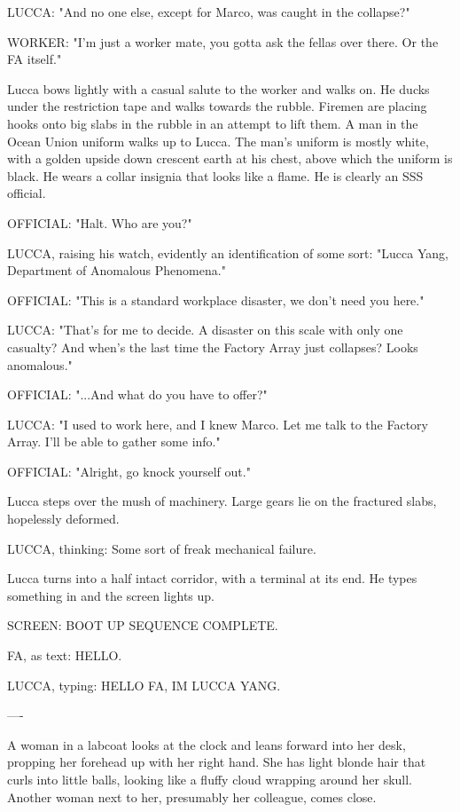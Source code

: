 \documentclass[11pt]{article}
\begin{document}
LUCCA: "And no one else, except for Marco, was caught in the collapse?"

WORKER: "I'm just a worker mate, you gotta ask the fellas over there. Or the FA itself."

Lucca bows lightly with a casual salute to the worker and walks on. 
He ducks under the restriction tape and walks towards the rubble. 
Firemen are placing hooks onto big slabs in the rubble in an attempt to lift them. 
A man in the Ocean Union uniform walks up to Lucca. 
The man's uniform is mostly white, with a golden upside down crescent earth at his chest, above which the uniform is black. 
He wears a collar insignia that looks like a flame. 
He is clearly an SSS official. 

OFFICIAL: "Halt. Who are you?"

LUCCA, raising his watch, evidently an identification of some sort: "Lucca Yang, Department of Anomalous Phenomena."

OFFICIAL: "This is a standard workplace disaster, we don't need you here."

LUCCA: "That's for me to decide. A disaster on this scale with only one casualty? 
And when's the last time the Factory Array just collapses? Looks anomalous."

OFFICIAL: "...And what do you have to offer?"

LUCCA: "I used to work here, and I knew Marco. Let me talk to the Factory Array. I'll be able to gather some info."

OFFICIAL: "Alright, go knock yourself out." 

Lucca steps over the mush of machinery. 
Large gears lie on the fractured slabs, hopelessly deformed. 

LUCCA, thinking: Some sort of freak mechanical failure. 

Lucca turns into a half intact corridor, with a terminal at its end. 
He types something in and the screen lights up. 

SCREEN: BOOT UP SEQUENCE COMPLETE.

FA, as text: HELLO.

LUCCA, typing: HELLO FA, IM LUCCA YANG.

----

A woman in a labcoat looks at the clock and leans forward into her desk, propping her forehead up with her right hand.
She has light blonde hair that curls into little balls, looking like a fluffy cloud wrapping around her skull. 
Another woman next to her, presumably her colleague, comes close.
\end{document}
